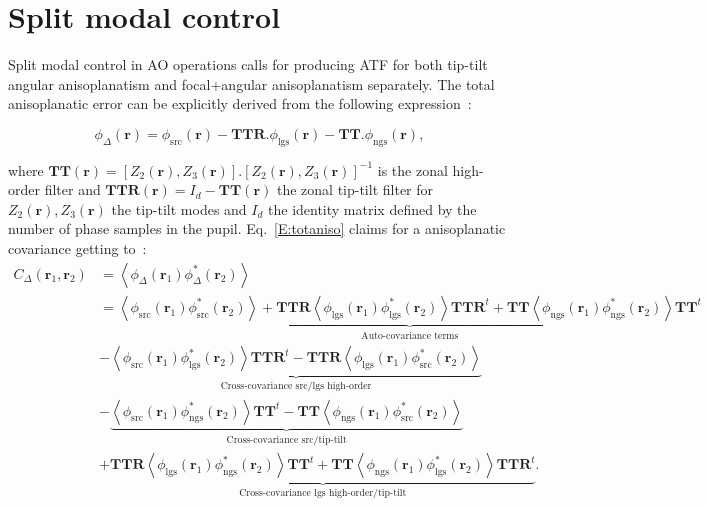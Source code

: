 \documentclass[12pt]{article}
\newcommand{\aver}[1]{\left\langle #1 \right\rangle}
\newcommand{\rbb}{\boldsymbol{r}}
\newcommand{\rbun}{\boldsymbol{r}_1}
\newcommand{\rbdeux}{\boldsymbol{r}_2}
\newcommand{\TTout}{\boldsymbol{\text{TTR}}}
\newcommand{\TTonly}{\boldsymbol{\text{TT}}}
\begin{document}
\section{Split modal control}

Split modal control in AO operations calls for producing ATF for both tip-tilt angular anisoplanatism and focal+angular anisoplanatism separately. The total anisoplanatic error can be explicitly derived from the following expression~:

\begin{equation} \label{E:totaniso}
\phi_\Delta(\rbb) = \phi_\text{src}(\rbb) - \TTout.\phi_\text{lgs}(\rbb) - \TTonly.\phi_\text{ngs}(\rbb),
\end{equation}

where $\TTonly(\rbb) = [Z_2(\rbb),Z_3(\rbb)].[Z_2(\rbb),Z_3(\rbb)]^{-1}$ is the zonal high-order filter and $\TTout(\rbb) = I_d - \TTonly(\rbb) $ the zonal tip-tilt filter for $Z_2(\rbb),Z_3(\rbb)$ the tip-tilt modes and $I_d$ the identity matrix defined by the number of phase samples in the pupil. Eq.~\ref{E:totaniso} claims for a anisoplanatic covariance getting to~:
\begin{equation} \label{E:cov2}
\begin{aligned}
C_\Delta(\rbun,\rbdeux) &= \aver{\phi_\Delta(\rbun)\phi^*_\Delta(\rbdeux)}\\
&=  \underbrace{\aver{\phi_\text{src}(\rbun)\phi^*_\text{src}(\rbdeux)} + \TTout\aver{\phi_\text{lgs}(\rbun)\phi^*_\text{lgs}(\rbdeux)}\TTout^t + \TTonly\aver{\phi_\text{ngs}(\rbun)\phi^*_\text{ngs}(\rbdeux)}\TTonly^t}_{\text{Auto-covariance terms}}\\
&- \underbrace{\aver{\phi_\text{src}(\rbun)\phi^*_\text{lgs}(\rbdeux)}\TTout^t - \TTout\aver{\phi_\text{lgs}(\rbun)\phi^*_\text{src}(\rbdeux)}}_{\text{Cross-covariance src/lgs high-order}}\\
&- \underbrace{\aver{\phi_\text{src}(\rbun)\phi^*_\text{ngs}(\rbdeux)}\TTonly^t - \TTonly\aver{\phi_\text{ngs}(\rbun)\phi^*_\text{src}(\rbdeux)}}_{\text{Cross-covariance src/tip-tilt}}\\
&+ \underbrace{\TTout\aver{\phi_\text{lgs}(\rbun)\phi^*_\text{ngs}(\rbdeux)}\TTonly^t + \TTonly\aver{\phi_\text{ngs}(\rbun)\phi^*_\text{lgs}(\rbdeux)}\TTout^t}_{\text{Cross-covariance lgs high-order/tip-tilt}}.
\end{aligned}
\end{equation}
\end{document}
